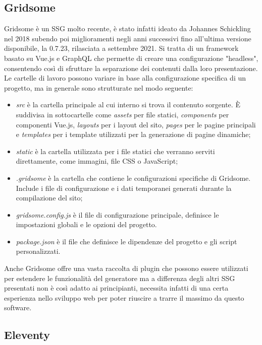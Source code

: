 \documentclass[target=bach,aauheader=]{thud}
\begin{document}
\subsection{Gridsome}
Gridsome è un SSG molto recente, è stato infatti ideato da Johannes Schickling nel 2018 subendo poi miglioramenti negli anni successivi fino all'ultima versione disponibile, la 0.7.23, rilasciata a settembre 2021.
Si tratta di un framework basato su Vue.js e GraphQL che permette di creare una configurazione "headless", consentendo così di sfruttare la separazione dei contenuti dalla loro presentazione.
Le cartelle di lavoro possono variare in base alla configurazione specifica di un progetto, ma in generale sono strutturate nel modo seguente:

\begin{itemize}
    \item \textit{src} è la cartella principale al cui interno si trova il contenuto sorgente. È suddivisa in sottocartelle come \textit{assets} per file statici, \textit{components} per componenti Vue.js, \textit{layouts} per i layout del sito, \textit{pages} per le pagine principali e \textit{templates} per i template utilizzati per la generazione di pagine dinamiche;
    \item \textit{static} è la cartella utilizzata per i file statici che verranno serviti direttamente, come immagini, file CSS o JavaScript;
    \item \textit{.gridsome} è la cartella che contiene le configurazioni specifiche di Gridsome. Include i file di configurazione e i dati temporanei generati durante la compilazione del sito;
    \item \textit{gridsome.config.js} è il file di configurazione principale, definisce le impostazioni globali e le opzioni del progetto.
    \item \textit{package.json} è il file che definisce le dipendenze del progetto e gli script personalizzati.
\end{itemize}

Anche Gridsome offre una vasta raccolta di plugin che possono essere utilizzati per estendere le funzionalità del generatore ma a differenza degli altri SSG presentati non è così adatto ai principianti, necessita infatti di una certa esperienza nello sviluppo web per poter riuscire a trarre il massimo da questo software.

\subsection{Eleventy}
\end{document}
